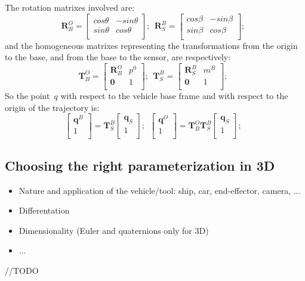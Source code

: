 The rotation matrixes involved are:
\begin{equation}
\mathbf{R}^O_B = 
\left[
 \begin{array}{cc}
    cos\theta   &  -sin\theta  \\
    sin\theta  & cos\theta \\
 \end{array}
 \right];\ \ 
\mathbf{R}^B_S = 
\left[
 \begin{array}{cc}
    cos\beta   &  -sin\beta  \\
    sin\beta  & cos\beta \\
 \end{array}
 \right];\ \ 
\end{equation}
and the homogeneous matrixes representing the transformations from the origin to the base, and from the base to the sensor, are respectively:
\begin{equation}
\mathbf{T}^O_B = 
\left[
 \begin{array}{cc}
    \mathbf{R}^O_B  &  p^0  \\
    \mathbf{0} & 1 \\
 \end{array}
 \right];\ \ 
\mathbf{T}^B_S = 
\left[
 \begin{array}{cc}
    \mathbf{R}^B_S  &  m^B  \\
    \mathbf{0} & 1 \\
 \end{array}
 \right];\ \ 
\end{equation}
So the point~$q$ with respect to the vehicle base frame and with respect to the origin of the trajectory is: 
\begin{equation}
\label{eq:world_vehicle_sensor_frames}
\left[
\begin{array}{c}
    \mathbf{q}^B\\
    1 \\
 \end{array}
\right] = 
\mathbf{T}^B_S 
\left[
\begin{array}{c}
    \mathbf{q}_S\\
    1 \\
 \end{array}
\right];\ \ 
\left[
\begin{array}{c}
    \mathbf{q}^O\\
    1 \\
 \end{array}
\right] = 
\mathbf{T}^O_B \mathbf{T}^B_S 
\left[
\begin{array}{c}
    \mathbf{q}_S\\
    1 \\
 \end{array}
\right];\ \ 
\end{equation}
  

\subsection{Choosing the right parameterization in 3D}
\begin{itemize}
 \item Nature and application of the vehicle/tool: ship, car, end-effector, camera, ...
 \item Differentation
 \item Dimensionality (Euler and quaternions only for 3D)
 \item ...
\end{itemize}
//TODO
